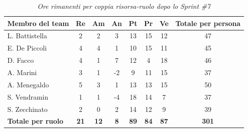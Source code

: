 ﻿\documentclass[a4paper, 10pt, colorlinks=true, linkcolor=black, urlcolor=blue, citecolor=blue, hidelinks]{article}
\renewcommand{\arraystretch}{1.2}
\begin{document}
\begin{table}[H]
    \centering
    \renewcommand{\arraystretch}{1.4}
    \begin{tabular}{|l|c|c|c|c|c|c|c|}
        \hline
        \rowcolor{bluBitless!15}
        \textbf{Membro del team} & \textbf{Re} & \textbf{Am} & \textbf{An} & \textbf{Pt} & \textbf{Pr} & \textbf{Ve} & \textbf{Totale per persona} \\
        \hline
        L. Battistella & 2 & 2 & 3 & 13 & 15 & 12 & 47 \\ \hline
        E. De Piccoli & 4 & 4 & 1 & 10 & 15 & 11 & 45 \\ \hline
        D. Facco & 4 & 1 & 7 & 12 & 4 & 18 & 46 \\ \hline
        A. Marini & 3 & 1 & -2 & 9 & 11 & 15 & 37 \\ \hline
        A. Menegaldo & 5 & 3 & 1 & 13 & 13 & 15 & 50 \\ \hline
        S. Vendramin & 1 & 1 & -4 & 18 & 14 & 7 & 37 \\ \hline
        S. Zecchinato & 2 & 0 & 2 & 14 & 12 & 9 & 39 \\ \hline
        \rowcolor{bluBitless!8}
        \textbf{Totale per ruolo} & \textbf{21} & \textbf{12} & \textbf{8} & \textbf{89} & \textbf{84} & \textbf{87} & \textbf{301} \\
        \hline
    \end{tabular}
    \caption{\textit{Ore rimanenti per coppia risorsa-ruolo dopo lo Sprint \#7}}
\end{table}
\end{document}
